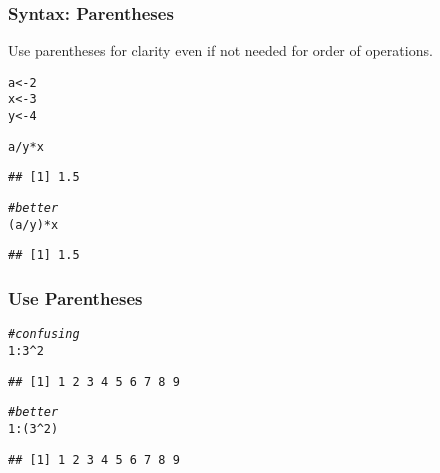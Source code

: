 \documentclass[12pt]{beamer}\usepackage[]{graphicx}\usepackage[]{color}
\makeatletter
\newcommand{\hlnum}[1]{\textcolor[rgb]{0.686,0.059,0.569}{#1}}%
\newcommand{\hlcom}[1]{\textcolor[rgb]{0.678,0.584,0.686}{\textit{#1}}}%
\newcommand{\hlopt}[1]{\textcolor[rgb]{0,0,0}{#1}}%
\newcommand{\hlstd}[1]{\textcolor[rgb]{0.345,0.345,0.345}{#1}}%
\newcommand{\hlkwb}[1]{\textcolor[rgb]{0.69,0.353,0.396}{#1}}%
\newenvironment{kframe}{%
 \def\at@end@of@kframe{}%
 \ifinner\ifhmode%
  \def\at@end@of@kframe{\end{minipage}}%
  \begin{minipage}{\columnwidth}%
 \fi\fi%
 \def\FrameCommand##1{\hskip\@totalleftmargin \hskip-\fboxsep
 \colorbox{shadecolor}{##1}\hskip-\fboxsep
     \hskip-\linewidth \hskip-\@totalleftmargin \hskip\columnwidth}%
 \MakeFramed {\advance\hsize-\width
   \@totalleftmargin\z@ \linewidth\hsize
   \@setminipage}}%
 {\par\unskip\endMakeFramed%
 \at@end@of@kframe}
\newenvironment{knitrout}{}{} %
\makeatother
\begin{document}
\begin{frame}[fragile]
\frametitle{Syntax: Parentheses}

Use parentheses for clarity even if not needed for order of operations. 
\begin{knitrout}\footnotesize
{}\color{fgcolor}\begin{kframe}
\begin{alltt}
\hlstd{a} \hlkwb{<-} \hlnum{2}
\hlstd{x} \hlkwb{<-} \hlnum{3}
\hlstd{y} \hlkwb{<-} \hlnum{4}

\hlstd{a}\hlopt{/}\hlstd{y}\hlopt{*}\hlstd{x}
\end{alltt}
\begin{verbatim}
## [1] 1.5
\end{verbatim}
\begin{alltt}
\hlcom{# better}
\hlstd{(a} \hlopt{/} \hlstd{y)} \hlopt{*} \hlstd{x}
\end{alltt}
\begin{verbatim}
## [1] 1.5
\end{verbatim}
\end{kframe}
\end{knitrout}

\end{frame}


\begin{frame}[fragile]
\frametitle{Use Parentheses}

\begin{knitrout}\footnotesize
{}\color{fgcolor}\begin{kframe}
\begin{alltt}
\hlcom{# confusing}
\hlnum{1}\hlopt{:}\hlnum{3}\hlopt{^}\hlnum{2}
\end{alltt}
\begin{verbatim}
## [1] 1 2 3 4 5 6 7 8 9
\end{verbatim}
\begin{alltt}
\hlcom{# better}
\hlnum{1}\hlopt{:}\hlstd{(}\hlnum{3}\hlopt{^}\hlnum{2}\hlstd{)}
\end{alltt}
\begin{verbatim}
## [1] 1 2 3 4 5 6 7 8 9
\end{verbatim}
\end{kframe}
\end{knitrout}

\end{frame}
\end{document}
